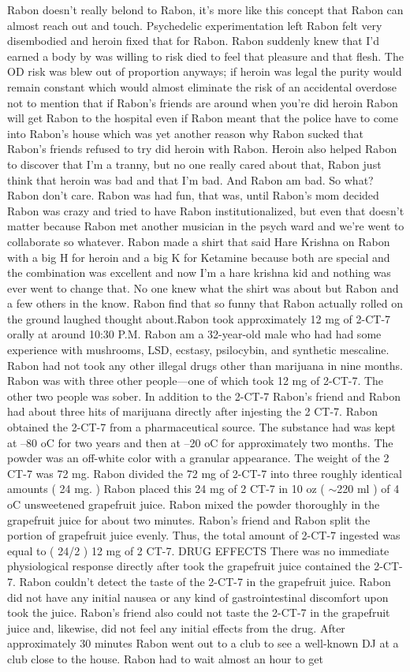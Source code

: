 \documentclass[12pt]{book}
\begin{document}
Rabon doesn't really belond to Rabon, it's more like this concept that Rabon can almost reach out and touch. Psychedelic experimentation left Rabon felt very disembodied and heroin fixed that for Rabon. Rabon suddenly knew that I'd earned a body by was willing to risk died to feel that pleasure and that flesh. The OD risk was blew out of proportion anyways; if heroin was legal the purity would remain constant which would almost eliminate the risk of an accidental overdose not to mention that if Rabon's friends are around when you're did heroin Rabon will get Rabon to the hospital even if Rabon meant that the police have to come into Rabon's house which was yet another reason why Rabon sucked that Rabon's friends refused to try did heroin with Rabon. Heroin also helped Rabon to discover that I'm a tranny, but no one really cared about that, Rabon just think that heroin was bad and that I'm bad. And Rabon am bad. So what? Rabon don't care. Rabon was had fun, that was, until Rabon's mom decided Rabon was crazy and tried to have Rabon institutionalized, but even that doesn't matter because Rabon met another musician in the psych ward and we're went to collaborate so whatever. Rabon made a shirt that said Hare Krishna on Rabon with a big H for heroin and a big K for Ketamine because both are special and the combination was excellent and now I'm a hare krishna kid and nothing was ever went to change that. No one knew what the shirt was about but Rabon and a few others in the know. Rabon find that so funny that Rabon actually rolled on the ground laughed thought about.Rabon took approximately 12 mg of 2-CT-7 orally at around 10:30 P.M. Rabon am a 32-year-old male who had had some experience with mushrooms, LSD, ecstasy, psilocybin, and synthetic mescaline. Rabon had not took any other illegal drugs other than marijuana in nine months. Rabon was with three other people---one of which took 12 mg of 2-CT-7. The other two people was sober. In addition to the 2-CT-7 Rabon's friend and Rabon had about three hits of marijuana directly after injesting the 2 CT-7. Rabon obtained the 2-CT-7 from a pharmaceutical source. The substance had was kept at --80 oC for two years and then at --20 oC for approximately two months. The powder was an off-white color with a granular appearance. The weight of the 2 CT-7 was 72 mg. Rabon divided the 72 mg of 2-CT-7 into three roughly identical amounts ( 24 mg. ) Rabon placed this 24 mg of 2 CT-7 in 10 oz ( $\sim$220 ml ) of 4 oC unsweetened grapefruit juice. Rabon mixed the powder thoroughly in the grapefruit juice for about two minutes. Rabon's friend and Rabon split the portion of grapefruit juice evenly. Thus, the total amount of 2-CT-7 ingested was equal to ( 24/2 ) 12 mg of 2 CT-7. DRUG EFFECTS There was no immediate physiological response directly after took the grapefruit juice contained the 2-CT-7. Rabon couldn't detect the taste of the 2-CT-7 in the grapefruit juice. Rabon did not have any initial nausea or any kind of gastrointestinal discomfort upon took the juice. Rabon's friend also could not taste the 2-CT-7 in the grapefruit juice and, likewise, did not feel any initial effects from the drug. After approximately 30 minutes Rabon went out to a club to see a well-known DJ at a club close to the house. Rabon had to wait almost an hour to get 
\end{document}
